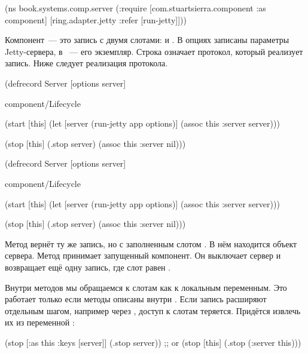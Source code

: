 \else

\begin{clojure}
(ns book.systems.comp.server
  (:require
   [com.stuartsierra.component :as component]
   [ring.adapter.jetty :refer [run-jetty]]))
\end{clojure}

\fi

Компонент~--- это запись с двумя слотами:  и . В
опциях записаны параметры Jetty-сервера, в ~--- его
экземпляр. Строка  означает протокол, который
реализует запись. Ниже следует реализация протокола.

\ifnarrow

\begin{clojure}
(defrecord Server [options server]

  component/Lifecycle

  (start [this]
    (let [server (run-jetty app
                   options)]
      (assoc this :server server)))

  (stop [this]
    (.stop server)
    (assoc this :server nil)))
\end{clojure}

\else

\begin{clojure}
(defrecord Server [options server]

  component/Lifecycle

  (start [this]
    (let [server (run-jetty app options)]
      (assoc this :server server)))

  (stop [this]
    (.stop server)
    (assoc this :server nil)))
\end{clojure}

\fi

Метод  вернёт ту же запись, но с заполненным слотом
. В нём находится объект сервера. Метод  принимает
запущенный компонент. Он выключает сервер и возвращает ещё одну запись, где слот
 равен .


Внутри методов мы обращаемся к слотам как к локальным переменным. Это работает
только если методы описаны внутри . Если запись расширяют
отдельным шагом, например через , доступ к слотам
теряется. Придётся извлечь их из переменной :

\begin{clojure}
(stop [{:as this :keys [server]}]
  (.stop server))
;; or
(stop [this]
  (.stop (:server this)))
\end{clojure}

